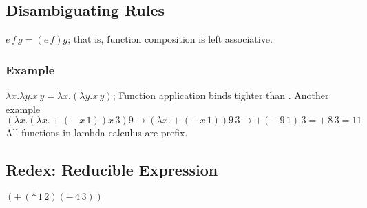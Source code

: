 \documentclass[]{article}
\begin{document}
\subsection*{Disambiguating Rules}
$e\,f\,g = (e\,f)g$; that is, function composition is left associative.

\subsubsection*{Example}
$\lambda x.\lambda y.x\,y = \lambda x.(\lambda y.x\,y)$; Function application
binds tighter than .
Another example
\[ (\lambda x.(\lambda x.+(-\,x\,1))x\,3)9 \rightarrow (\lambda
x.+(-\,x\,1))9\,3\rightarrow+(-\,9\,1)\,3=+\,8\,3=11\]
All functions in lambda calculus are prefix.

\subsection*{Redex: Reducible Expression}
$(+\,(*\,1\,2)(-\,4\,3))$
\end{document}
